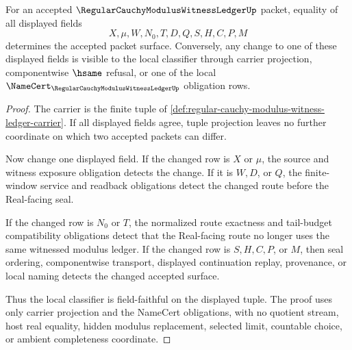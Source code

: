 \begin{theorem}
\label{thm:regular-cauchy-modulus-witness-ledger-field-faithful-surface}
For an accepted $\RegularCauchyModulusWitnessLedgerUp$ packet, equality of all displayed fields
$$
X,\mu,W,N_0,T,D,Q,S,H,C,P,M
$$
determines the accepted packet surface. Conversely, any change to one of these displayed fields is visible to the local classifier through carrier projection, componentwise $\hsame$ refusal, or one of the local $\NameCert_{\RegularCauchyModulusWitnessLedgerUp}$ obligation rows.
\end{theorem}
\begin{proof}
The carrier is the finite tuple of \autoref{def:regular-cauchy-modulus-witness-ledger-carrier}. If all displayed fields agree, tuple projection leaves no further coordinate on which two accepted packets can differ.

Now change one displayed field. If the changed row is $X$ or $\mu$, the source and witness exposure obligation detects the change. If it is $W,D$, or $Q$, the finite-window service and readback obligations detect the changed route before the Real-facing seal.

If the changed row is $N_0$ or $T$, the normalized route exactness and tail-budget compatibility obligations detect that the Real-facing route no longer uses the same witnessed modulus ledger. If the changed row is $S,H,C,P$, or $M$, then seal ordering, componentwise transport, displayed continuation replay, provenance, or local naming detects the changed accepted surface.

Thus the local classifier is field-faithful on the displayed tuple. The proof uses only carrier projection and the NameCert obligations, with no quotient stream, host real equality, hidden modulus replacement, selected limit, countable choice, or ambient completeness coordinate.
\end{proof}

